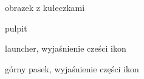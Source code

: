 obrazek z kułeczkami

pulpit

launcher, wyjaśnienie cześci ikon

górny pasek, wyjaśnienie części ikon


